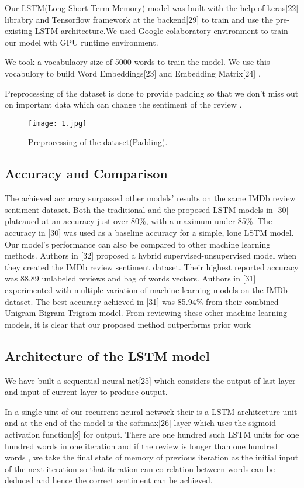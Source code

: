 \documentclass[conference]{IEEEtran}
\begin{document}
Our LSTM(Long Short Term Memory) model was built with the help of keras[22] librabry and Tensorflow framework at the backend[29] to train and use the pre-existing LSTM architecture.We used Google colaboratory environment to train our model wth GPU runtime environment.

We took a vocabulaory size of 5000 words to train the model. We use this vocabulory to build Word Embeddings[23] and Embedding Matrix[24] .

Preprocessing of the dataset is done to provide padding so that we don't miss out on important data which can change the sentiment of the review .

\begin{figure}[htbp!]
\centerline{\texttt{[image: 1.jpg]}}
\caption{Preprocessing of the dataset(Padding).}
\label{fig}
\end{figure}

\subsection{Accuracy and Comparison}

The achieved accuracy surpassed other models’ results on
the same IMDb review sentiment dataset. Both the traditional
and the proposed LSTM models in [30] plateaued at an accuracy
just over 80\%, with a maximum under 85\%. The accuracy in
[30] was used as a baseline accuracy for a simple, lone LSTM
model. Our model’s performance can also be compared to
other machine learning methods. Authors in [32] proposed a
hybrid supervised-unsupervised model when they created the
IMDb review sentiment dataset. Their highest reported
accuracy was 88.89%
unlabeled reviews and bag of words vectors. Authors in [31]
experimented with multiple variation of machine learning
models on the IMDb dataset. The best accuracy achieved in [31]
was 85.94\% from their combined Unigram-Bigram-Trigram
model. From reviewing these other machine learning models, it
is clear that our proposed method outperforms prior work

\subsection{Architecture of the LSTM model}

We have built a sequential neural net[25] which considers the output of last layer and input of current layer to produce output.

In a single uint of our recurrent neural network their is a LSTM architecture unit and at the end of the model is the softmax[26] layer which uses the sigmoid activation function[8] for output. There are one hundred such LSTM units for one hundred words in one iteration and if the review is longer than one hundred words , we take the final state of memory of previous iteration as the initial input of the next iteration so that iteration can co-relation between words can be deduced and hence the correct sentiment can be achieved. 
\end{document}
